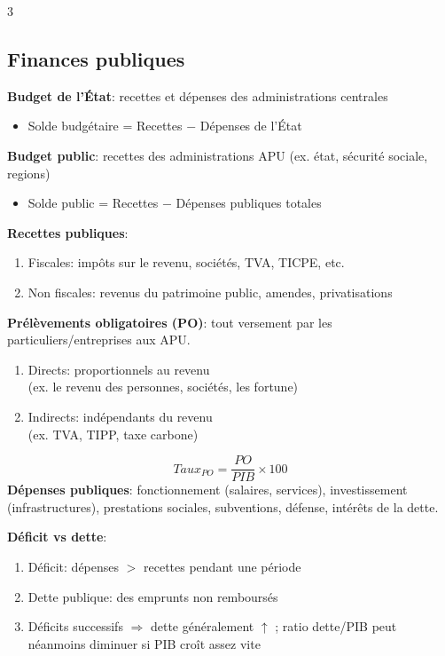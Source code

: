 \documentclass[12pt, a4paper]{article}
\begin{document}
\begin{multicols*}{3}
\colbreak
\subsection{Finances publiques}

\textbf{Budget de l'État}: recettes et dépenses des administrations centrales\\
\begin{itemize}[leftmargin=*]
  \item Solde budgétaire = Recettes $-$ Dépenses de l'État
\end{itemize}
\textbf{Budget public}: recettes des administrations APU (ex. état, sécurité sociale, regions) 
\begin{itemize}[leftmargin=*]
  \item Solde public = Recettes $-$ Dépenses publiques totales
\end{itemize}

\textbf{Recettes publiques}:
\begin{enumerate}[\roman*.]
  \item Fiscales: impôts sur le revenu, sociétés, TVA, TICPE, etc.
  \item Non fiscales: revenus du patrimoine public, amendes, privatisations
\end{enumerate}

\textbf{Prélèvements obligatoires (PO)}: tout versement par les particuliers/entreprises aux APU.
\begin{enumerate}[\roman*.]
  \item Directs: proportionnels au revenu\\(ex. le revenu des personnes, sociétés, les fortune) 
  \item Indirects: indépendants du revenu\\(ex. TVA, TIPP, taxe carbone) 
\end{enumerate}
\[
\boxed{Taux_{PO}=\frac{PO}{PIB}\times100}
\]
\textbf{Dépenses publiques}: fonctionnement (salaires, services), investissement (infrastructures), prestations sociales, subventions, défense, intérêts de la dette.

\textbf{Déficit vs dette}:
\begin{enumerate}[\roman*.]
  \item Déficit: dépenses $>$ recettes pendant une période 
  \item Dette publique: des emprunts non remboursés
  \item Déficits successifs $\Rightarrow$ dette généralement $\uparrow$ ; ratio dette/PIB peut néanmoins diminuer si PIB croît assez vite
\end{enumerate}


\end{multicols*}
\end{document}
